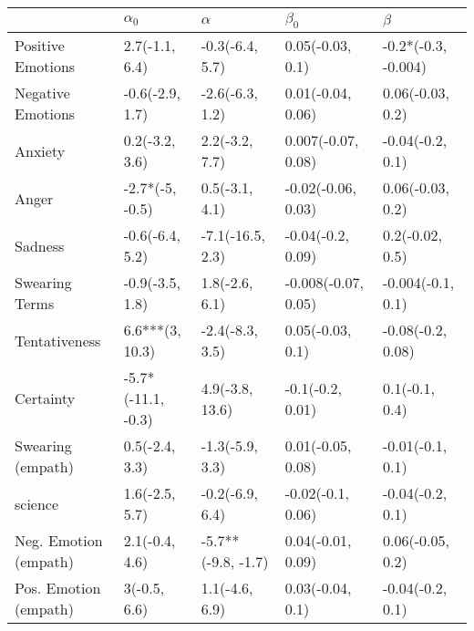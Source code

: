 \begin{tabular}{lllll}
\toprule
{} &          $\alpha_0$ &            $\alpha$ &            $\beta_0$ &              $\beta$ \\
\midrule
Positive Emotions     &      2.7(-1.1, 6.4) &     -0.3(-6.4, 5.7) &     0.05(-0.03, 0.1) &  -0.2*(-0.3, -0.004) \\
Negative Emotions     &     -0.6(-2.9, 1.7) &     -2.6(-6.3, 1.2) &    0.01(-0.04, 0.06) &     0.06(-0.03, 0.2) \\
Anxiety               &      0.2(-3.2, 3.6) &      2.2(-3.2, 7.7) &   0.007(-0.07, 0.08) &     -0.04(-0.2, 0.1) \\
Anger                 &     -2.7*(-5, -0.5) &      0.5(-3.1, 4.1) &   -0.02(-0.06, 0.03) &     0.06(-0.03, 0.2) \\
Sadness               &     -0.6(-6.4, 5.2) &    -7.1(-16.5, 2.3) &    -0.04(-0.2, 0.09) &      0.2(-0.02, 0.5) \\
Swearing Terms        &     -0.9(-3.5, 1.8) &      1.8(-2.6, 6.1) &  -0.008(-0.07, 0.05) &    -0.004(-0.1, 0.1) \\
Tentativeness         &     6.6***(3, 10.3) &     -2.4(-8.3, 3.5) &     0.05(-0.03, 0.1) &    -0.08(-0.2, 0.08) \\
Certainty             &  -5.7*(-11.1, -0.3) &     4.9(-3.8, 13.6) &     -0.1(-0.2, 0.01) &       0.1(-0.1, 0.4) \\
Swearing (empath)     &      0.5(-2.4, 3.3) &     -1.3(-5.9, 3.3) &    0.01(-0.05, 0.08) &     -0.01(-0.1, 0.1) \\
science               &      1.6(-2.5, 5.7) &     -0.2(-6.9, 6.4) &    -0.02(-0.1, 0.06) &     -0.04(-0.2, 0.1) \\
Neg. Emotion (empath) &      2.1(-0.4, 4.6) &  -5.7**(-9.8, -1.7) &    0.04(-0.01, 0.09) &     0.06(-0.05, 0.2) \\
Pos. Emotion (empath) &        3(-0.5, 6.6) &      1.1(-4.6, 6.9) &     0.03(-0.04, 0.1) &     -0.04(-0.2, 0.1) \\
\bottomrule
\end{tabular}
